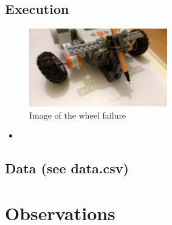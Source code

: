 \documentclass{scrartcl}
\begin{document}
\subsection{Execution}
\begin{figure}
 \center
 \includegraphics[width= 6cm]{img/wheel_failure.jpg}
 \caption{Image of the wheel failure}
 \label{fig:failure}
\end{figure}


\begin{itemize}
\item
\end{itemize}


\subsection{Data (see data.csv)}

\noindent
{}
\newline

\noindent
{}
\newline

\noindent
{}





\section{Observations}
\end{document}
